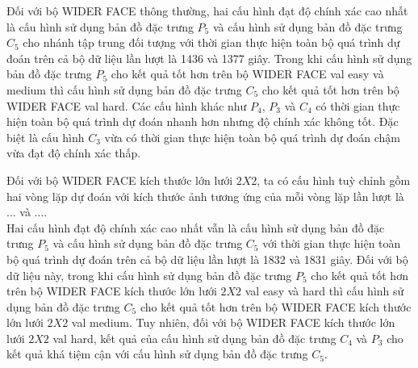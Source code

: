 {    \noindent
    Đối với bộ WIDER FACE thông thường, hai cấu hình đạt độ chính xác cao nhất là cấu hình sử dụng bản đồ đặc trưng ${P}_{5}$ và cấu hình sử dụng bản đồ đặc trưng ${C}_{5}$ cho nhánh tập trung đối tượng với thời gian thực hiện toàn bộ quá trình dự đoán trên cả bộ dữ liệu lần lượt là 1436 và 1377 giây.
    Trong khi cấu hình sử dụng bản đồ đặc trưng ${P}_{5}$ cho kết quả tốt hơn trên bộ WIDER FACE val easy và medium thì cấu hình sử dụng bản đồ đặc trưng ${C}_{5}$ cho kết quả tốt hơn trên bộ WIDER FACE val hard.
    Các cấu hình khác như ${P}_{4}$, ${P}_{3}$ và ${C}_{4}$ có thời gian thực hiện toàn bộ quá trình dự đoán nhanh hơn nhưng độ chính xác không tốt.
    Đặc biệt là cấu hình ${C}_{3}$ vừa có thời gian thực hiện toàn bộ quá trình dự đoán chậm vừa đạt độ chính xác thấp.

    \noindent
    Đối với bộ WIDER FACE kích thước lớn lưới $2 X 2$, ta có cấu hình tuỳ chỉnh gồm hai vòng lặp dự đoán với kích thước ảnh tương ứng của mỗi vòng lặp lần lượt là ... và .... \\
    Hai cấu hình đạt độ chính xác cao nhất vẫn là cấu hình sử dụng bản đồ đặc trưng ${P}_{5}$ và cấu hình sử dụng bản đồ đặc trưng ${C}_{5}$ với thời gian thực hiện toàn bộ quá trình dự đoán trên cả bộ dữ liệu lần lượt là 1832 và 1831 giây.
    Đối với bộ dữ liệu này, trong khi cấu hình sử dụng bản đồ đặc trưng ${P}_{5}$ cho kết quả tốt hơn trên bộ WIDER FACE kích thước lớn lưới $2 X 2$ val easy và hard thì cấu hình sử dụng bản đồ đặc trưng ${C}_{5}$ cho kết quả tốt hơn trên bộ WIDER FACE kích thước lớn lưới $2 X 2$ val medium.
    Tuy nhiên, đối với bộ WIDER FACE kích thước lớn lưới $2 X 2$ val hard, kết quả của cấu hình sử dụng bản đồ đặc trưng ${C}_{4}$ và ${P}_{3}$ cho kết quả khá tiệm cận với cấu hình sử dụng bản đồ đặc trưng ${C}_{5}$.

}
